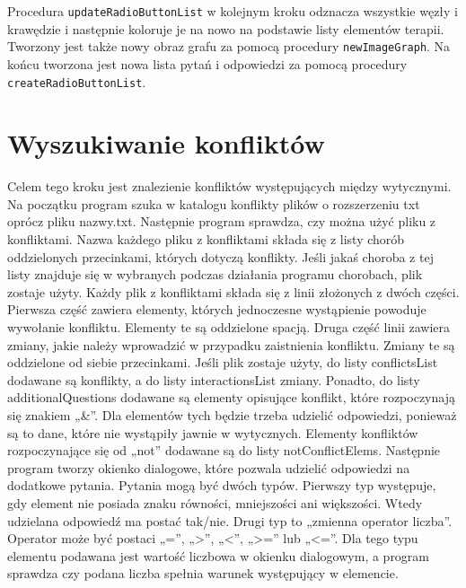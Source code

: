 Procedura \texttt{updateRadioButtonList} w kolejnym kroku odznacza wszystkie węzły i krawędzie i następnie koloruje je na nowo na podstawie listy elementów terapii. Tworzony jest także nowy obraz grafu za pomocą procedury \texttt{newImageGraph}. Na końcu tworzona jest nowa lista pytań i odpowiedzi za pomocą procedury \texttt{createRadioButtonList}. 

\section{Wyszukiwanie konfliktów}
Celem tego kroku jest znalezienie konfliktów występujących między wytycznymi. 
Na początku program szuka w katalogu konflikty plików o rozszerzeniu txt oprócz pliku nazwy.txt. Następnie program sprawdza, czy można użyć pliku z konfliktami. Nazwa każdego pliku z konfliktami składa się z listy chorób oddzielonych przecinkami, których dotyczą konflikty. Jeśli jakaś choroba z tej listy znajduje się w wybranych podczas działania programu chorobach, plik zostaje użyty. Każdy plik z konfliktami składa się z linii złożonych z dwóch części. Pierwsza część zawiera elementy, których jednoczesne wystąpienie powoduje wywołanie konfliktu. Elementy te są oddzielone spacją. Druga część linii zawiera zmiany, jakie należy wprowadzić w przypadku zaistnienia konfliktu. Zmiany te są oddzielone od siebie przecinkami. Jeśli plik zostaje użyty, do listy conflictsList dodawane są konflikty, a do listy interactionsList zmiany. 
Ponadto, do listy additionalQuestions dodawane są elementy opisujące konflikt, które rozpoczynają się znakiem „\&”. Dla elementów tych będzie trzeba udzielić odpowiedzi, ponieważ są to dane, które nie wystąpiły jawnie w wytycznych. Elementy konfliktów rozpoczynające się od „not” dodawane są do listy notConflictElems. Następnie program tworzy okienko dialogowe, które pozwala udzielić odpowiedzi na dodatkowe pytania. Pytania mogą być dwóch typów. Pierwszy typ występuje, gdy element nie posiada znaku równości, mniejszości ani większości. Wtedy udzielana odpowiedź ma postać tak/nie. 
Drugi typ to „zmienna operator liczba”. Operator może być postaci „=”, „>”, „<”, „>=” lub „<=”. Dla tego typu elementu podawana jest wartość liczbowa w okienku dialogowym, a program sprawdza czy podana liczba spełnia warunek występujący w elemencie. 

